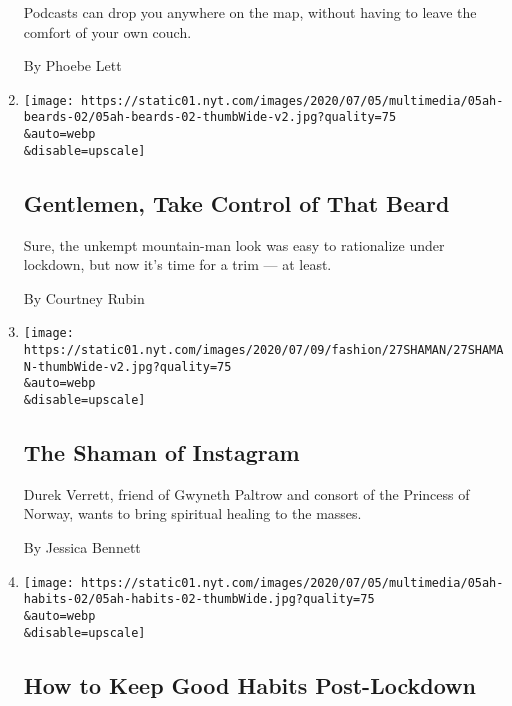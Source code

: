 \begin{enumerate}
  Podcasts can drop you anywhere on the map, without having to leave the
  comfort of your own couch.

  By Phoebe Lett
\item
  \href{/2020/07/03/at-home/coronavirus-beards.html}{}

  \texttt{[image: https://static01.nyt.com/images/2020/07/05/multimedia/05ah-beards-02/05ah-beards-02-thumbWide-v2.jpg?quality=75\\\&auto=webp\\\&disable=upscale]}

  \hypertarget{gentlemen-take-control-of-that-beard}{%
  \subsection{Gentlemen, Take Control of That
  Beard}\label{gentlemen-take-control-of-that-beard}}

  Sure, the unkempt mountain-man look was easy to rationalize under
  lockdown, but now it's time for a trim --- at least.

  By Courtney Rubin
\item
  \href{/2020/07/03/style/self-care/durek-verrett-instagram-shaman.html}{}

  \texttt{[image: https://static01.nyt.com/images/2020/07/09/fashion/27SHAMAN/27SHAMAN-thumbWide-v2.jpg?quality=75\\\&auto=webp\\\&disable=upscale]}

  \hypertarget{the-shaman-of-instagram}{%
  \subsection{The Shaman of Instagram}\label{the-shaman-of-instagram}}

  Durek Verrett, friend of Gwyneth Paltrow and consort of the Princess
  of Norway, wants to bring spiritual healing to the masses.

  By Jessica Bennett
\item
  \href{/2020/07/02/at-home/coronavirus-keep-good-habits.html}{}

  \texttt{[image: https://static01.nyt.com/images/2020/07/05/multimedia/05ah-habits-02/05ah-habits-02-thumbWide.jpg?quality=75\\\&auto=webp\\\&disable=upscale]}

  \hypertarget{how-to-keep-good-habits-post-lockdown}{%
  \subsection{How to Keep Good Habits
  Post-Lockdown}\label{how-to-keep-good-habits-post-lockdown}}


\end{enumerate}
